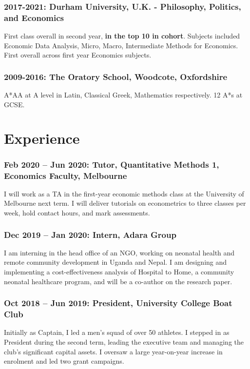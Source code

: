 \documentclass[letterpaper]{article}
\begin{document}
\subsubsection*{2017-2021: Durham University, U.K. - Philosophy, Politics, and Economics}
First class overall in second year, \textbf{in the top 10 in cohort}. Subjects included Economic Data Analysis, Micro, Macro, Intermediate Methods for Economics. First overall across first year Economics subjects. 

\subsubsection*{2009-2016: The Oratory School, Woodcote, Oxfordshire}
A*AA at A level in Latin, Classical Greek, Mathematics respectively. 12 A*s at GCSE.
  



\section*{Experience}
\subsubsection*{Feb 2020 – Jun 2020: Tutor, Quantitative Methods 1, Economics Faculty, Melbourne}
I will work as a TA in the first-year economic methods class at the University of Melbourne next term. I will deliver tutorials on econometrics to three classes per week, hold contact hours, and mark assessments.

\subsubsection*{Dec 2019 – Jan 2020: Intern, Adara Group}
I am interning in the head office of an NGO, working on neonatal health and remote community development in Uganda and Nepal. I am designing and implementing a cost-effectiveness analysis of Hospital to Home, a community neonatal healthcare program, and will be a co-author on the research paper.
\subsubsection*{Oct 2018 – Jun 2019: President, University College Boat Club}
Initially as Captain, I led a men’s squad of over 50 athletes. I stepped in as President during the second term, leading the executive team and managing the club’s significant capital assets. I oversaw a large year-on-year increase in enrolment and led two grant campaigns.
\end{document}
